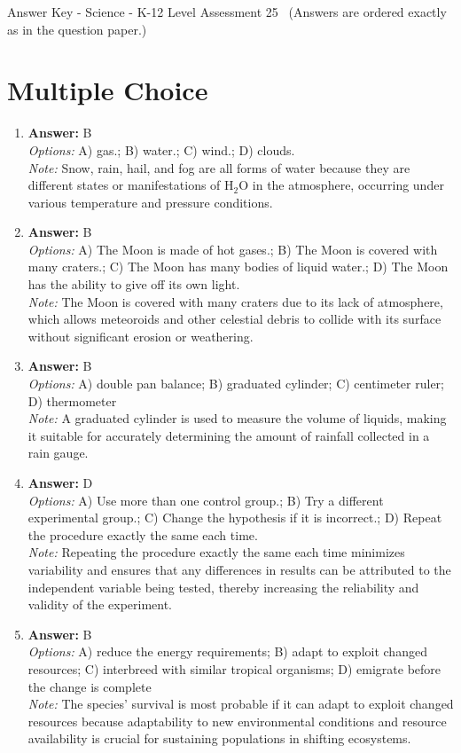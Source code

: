 \documentclass[12pt]{article}
\begin{document}
\begin{center}
Answer Key - Science - K-12 Level Assessment 25 \
\small (Answers are ordered exactly as in the question paper.)
\end{center}

\section*{Multiple Choice}
\begin{enumerate}[label=\arabic*.]
\item \textbf{Answer:} B
\\ \textit{Options:} A) gas.; B) water.; C) wind.; D) clouds.
\\ \textit{Note:} Snow, rain, hail, and fog are all forms of water because they are different states or manifestations of H$_{2}$O in the atmosphere, occurring under various temperature and pressure conditions.
\item \textbf{Answer:} B
\\ \textit{Options:} A) The Moon is made of hot gases.; B) The Moon is covered with many craters.; C) The Moon has many bodies of liquid water.; D) The Moon has the ability to give off its own light.
\\ \textit{Note:} The Moon is covered with many craters due to its lack of atmosphere, which allows meteoroids and other celestial debris to collide with its surface without significant erosion or weathering.
\item \textbf{Answer:} B
\\ \textit{Options:} A) double pan balance; B) graduated cylinder; C) centimeter ruler; D) thermometer
\\ \textit{Note:} A graduated cylinder is used to measure the volume of liquids, making it suitable for accurately determining the amount of rainfall collected in a rain gauge.
\item \textbf{Answer:} D
\\ \textit{Options:} A) Use more than one control group.; B) Try a different experimental group.; C) Change the hypothesis if it is incorrect.; D) Repeat the procedure exactly the same each time.
\\ \textit{Note:} Repeating the procedure exactly the same each time minimizes variability and ensures that any differences in results can be attributed to the independent variable being tested, thereby increasing the reliability and validity of the experiment.
\item \textbf{Answer:} B
\\ \textit{Options:} A) reduce the energy requirements; B) adapt to exploit changed resources; C) interbreed with similar tropical organisms; D) emigrate before the change is complete
\\ \textit{Note:} The species' survival is most probable if it can adapt to exploit changed resources because adaptability to new environmental conditions and resource availability is crucial for sustaining populations in shifting ecosystems.
\end{enumerate}
\end{document}
